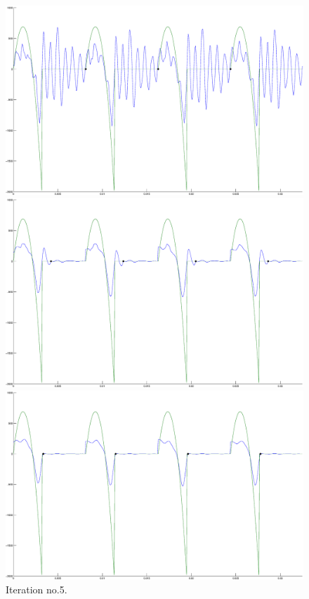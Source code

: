 \documentclass[12pt,a4]{article}
\begin{document}
\begin{figure}[H]
\begin{center}
 \caption*{In figures \ref{fig:app2-beginning} to \ref{fig:app2-end} the signal frequency is 123 Hz. The approximation algorithm acquired $Q_{guess} = 0.391$ at the end of the iterations, while the actual parameter $Q = 0.4$, relative error of the reconstruction $\approx$ 72.7\%, $\alpha \approx 167.5$. }
 \includegraphics[scale=.2]{img/Approx_iter_wRef-1.eps}
 \caption{Iteration no.1}\label{fig:app2-beginning}
 \includegraphics[scale=.2]{img/Approx_iter_wRef-2.eps}
 \caption{Iteration no.2}
 \includegraphics[scale=.2]{img/Approx_iter_wRef-4.eps}
 \caption{Iteration no.5.}
\end{center}
\end{figure}
\end{document}
